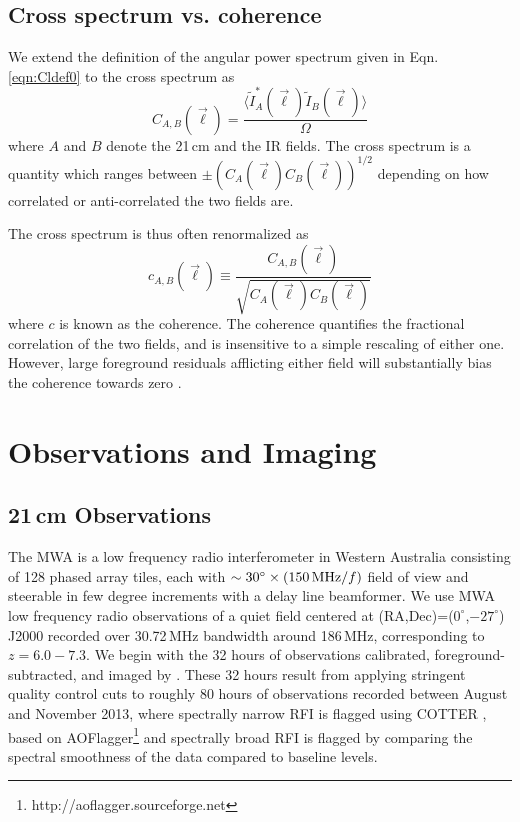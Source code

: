 \documentclass{emulateapj}
\begin{document}
\subsection{Cross spectrum vs. coherence}

We extend the definition of the angular power spectrum given in Eqn. \ref{eqn:Cldef0} to the cross spectrum as
\begin{equation}
\label{eqn:Cldefcross}
	C_{A,B}(\vec{\ell}) = \frac{\langle \tilde{I}_A^*(\vec{\ell})\tilde{I}_B(\vec{\ell})\rangle}{\Omega}
\end{equation}
where $A$ and $B$ denote the 21\,cm and the IR fields. The cross spectrum is a quantity which ranges between $\pm(C_{A}(\vec{\ell})C_{B}(\vec{\ell}))^{1/2}$ depending on how correlated or anti-correlated the two fields are. 

The cross spectrum is thus often renormalized as  
\begin{equation}
\label{eqn:Cldefcross}
	c_{A,B}(\vec{\ell}) \equiv \frac{C_{A,B}(\vec{\ell}) }{\sqrt{C_A(\vec{\ell})  C_B(\vec{\ell}) }}
\end{equation}
where $c$ is known as the coherence. The coherence quantifies the fractional correlation of the two fields, and is insensitive to a simple rescaling of either one. However, large foreground residuals afflicting either field will substantially bias the coherence towards zero \citep{lidz09,furlanettolidz07}. 

\section{Observations and Imaging}
\subsection{21\,cm Observations}

The MWA is a low frequency radio interferometer in Western Australia consisting of 128 phased array tiles, each with $\sim30^\circ\times(150\text{\,MHz}/f)$ field of view and steerable in few degree increments with a delay line beamformer. We use MWA low frequency radio observations of a quiet field centered at (RA,Dec)=($0^\circ$,$-27^\circ$) J2000 recorded over 30.72\,MHz bandwidth around 186\,MHz, corresponding to $z=6.0-7.3$. We begin with the 32 hours of observations calibrated, foreground-subtracted, and imaged by \citet{beardsley16}. These 32 hours result from applying stringent quality control cuts to roughly 80 hours of observations recorded between August and November 2013, where spectrally narrow RFI is flagged using COTTER \citep{AndreMWARFI}, based on AOFlagger\footnote{http://aoflagger.sourceforge.net} \citep{aoflagger} and spectrally broad RFI is flagged by comparing the spectral smoothness of the data compared to baseline levels. 
\end{document}
